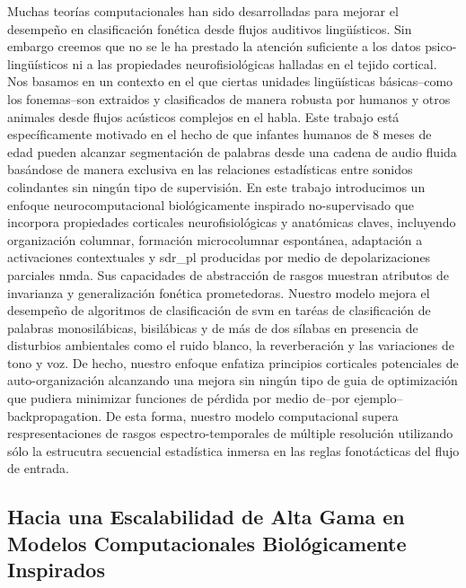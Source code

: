 Muchas teorías computacionales han sido desarrolladas para mejorar el desempeño en clasificación fonética desde flujos auditivos lingüísticos.
Sin embargo creemos que no se le ha prestado la atención suficiente a los datos psico-lingüísticos ni a las propiedades neurofisiológicas halladas en el tejido cortical.
Nos basamos en un contexto en el que ciertas unidades lingüísticas básicas--como los fonemas--son extraidos y clasificados de manera robusta por humanos y otros animales desde flujos acústicos complejos en el habla.
Este trabajo está específicamente motivado en el hecho de que infantes humanos de 8 meses de edad pueden alcanzar segmentación de palabras desde una cadena de audio fluida 
basándose de manera exclusiva en las relaciones estadísticas entre sonidos colindantes sin ningún tipo de supervisión. 
En este trabajo introducimos un enfoque neurocomputacional biológicamente inspirado no-supervisado que incorpora propiedades corticales neurofisiológicas y anatómicas claves, incluyendo organización columnar, formación microcolumnar espontánea, adaptación a activaciones contextuales y \gls{sdr_pl} producidas por medio de depolarizaciones parciales \gls{nmda}.
Sus capacidades de abstracción de rasgos muestran atributos de invarianza y generalización fonética prometedoras.
Nuestro modelo mejora el desempeño de algoritmos de clasificación de \gls{svm} en taréas de clasificación de palabras monosilábicas, bisilábicas y de más de dos sílabas en presencia de disturbios ambientales como el ruido blanco, la reverberación y las variaciones de tono y voz.
De hecho, nuestro enfoque enfatiza principios corticales potenciales  de auto-organización alcanzando una mejora sin ningún tipo de guia de optimización que pudiera minimizar funciones de pérdida por medio de--por ejemplo--backpropagation.
De esta forma, nuestro modelo computacional supera respresentaciones de rasgos espectro-temporales de múltiple resolución utilizando sólo la estrucutra secuencial estadística inmersa en las reglas fonotácticas del flujo de entrada.




\subsection{Hacia una Escalabilidad de Alta Gama en Modelos Computacionales Biológicamente Inspirados}


